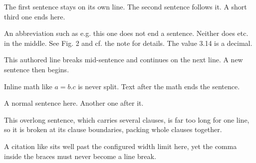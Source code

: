 \documentclass{article}
\begin{document}
The first sentence stays on its own line. The second sentence follows it. A short third one ends here.

An abbreviation such as e.g. this one does not end a sentence. Neither does etc. in the middle. See Fig. 2 and cf. the note for details. The value 3.14 is a decimal.

This authored line breaks mid-sentence and
continues on the next line. A new sentence then begins.

Inline math like $a = b. c$ is never split. Text after the math ends the sentence.

A normal sentence here. Another one after it.

This overlong sentence, which carries several clauses, is far too long for one line, so it is broken at its clause boundaries, packing whole clauses together.

A citation like \cite{smith2020, jones2021} sits well past the configured width limit here, yet the comma inside the braces must never become a line break.
\end{document}
